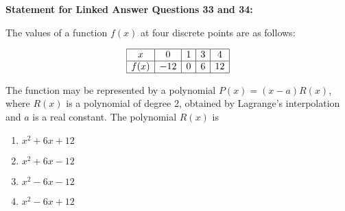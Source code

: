 \textbf{Statement for Linked Answer Questions 33 and 34:}

The values of a function $f(x)$ at four discrete points are as follows:

\[
\begin{array}{|c|c|c|c|c|}
\hline
x & 0 & 1 & 3 & 4 \\
\hline
f(x) & -12 & 0 & 6 & 12 \\
\hline
\end{array}
\]
\item The function may be represented by a polynomial $P(x) = (x - a)R(x)$, where $R(x)$ is a polynomial of degree 2, obtained by Lagrange's interpolation and $a$ is a real constant. The polynomial $R(x)$ is

\begin{multicols}{4}
\begin{enumerate}
    \item $x^2 + 6x + 12$
    \item $x^2 + 6x - 12$
    \item $x^2 - 6x - 12$
    \item $x^2 - 6x + 12$
\end{enumerate}
\end{multicols}

